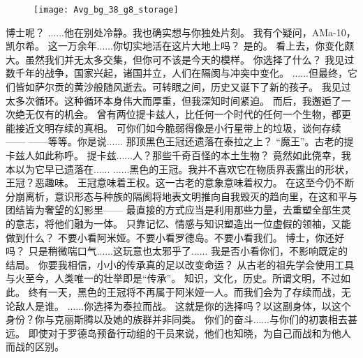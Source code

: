 \documentclass[openany]{book}
\begin{document}
\begin{figure}[h]
    \centering
    \texttt{[image: Avg\_bg\_38\_g8\_storage]}
\end{figure}
\begin{dialogue}
     博士呢？
     ......他在别处冷静。我也确实想与你独处片刻。
     我有个疑问，AMa-10，凯尔希。
     这一万余年......你切实地活在这片大地上吗？
     是的。
     看上去，你变化颇大。虽然我们并无太多交集，但你可不该是今天的模样。
     你选择了什么？
     我见过数千年的战争，国家兴起，诸国并立，人们在隔阂与冲突中变化。
     ......但最终，它们皆如萨尔贡的黄沙般随风逝去。可转眼之间，历史又诞下了新的孩子。
     我见过太多次循环。这种循环本身伟大而厚重，但我深知时间紧迫。
     而后，我邂逅了一次绝无仅有的机会。
     曾有两位提卡兹人，比任何一个时代的任何一个生物，都更能接近文明存续的真相。
     可你们如今脆弱得像是小行星带上的垃圾，谈何存续——
     ——等等。你是说......
     那顶黑色王冠还遗落在泰拉之上？
     “魔王”。古老的提卡兹人如此称呼。
     提卡兹......人？那些千奇百怪的本土生物？
     竟然如此侥幸，我本以为它早已遗落在......
     ......黑色的王冠。我并不喜欢它在物质界表露出的形状，王冠？恶趣味。
     王冠意味着王权。这一古老的意象意味着权力。
     在这至今仍不断分崩离析，意识形态与种族的隔阂将地表文明推向自我毁灭的趋向里，在这和平与团结皆为奢望的幻影里——
     最直接的方式应当是利用那些力量，去重塑全部生灵的意志，将他们融为一体。
     只靠记忆、情感与知识塑造出一位虚假的领袖，又能做到什么？
     不要小看阿米娅。不要小看罗德岛。不要小看我们。
     博士，你还好吗？
     只是稍微喘口气......这玩意也太邪乎了......
     我是否小看你们，不影响既定的结局。
     你要我相信，小小的传承真的足以改变命运？
     从古老的祖先学会使用工具与火至今，人类唯一的壮举即是“传承”。
     知识，文化，历史。所谓文明，不过如此。
     终有一天，黑色的王冠将不再属于阿米娅一人。而我们会为了存续而战，无论敌人是谁。
     ......你选择为泰拉而战。
     这就是你的选择吗？以这副身体，以这个身份？你与克丽斯腾以及她的族群并非同类。
     你们的奋斗......与你们的初衷相去甚远。
     即使对于罗德岛预备行动组的干员来说，他们也知晓，为自己而战和为他人而战的区别。

\end{dialogue}
\end{document}
